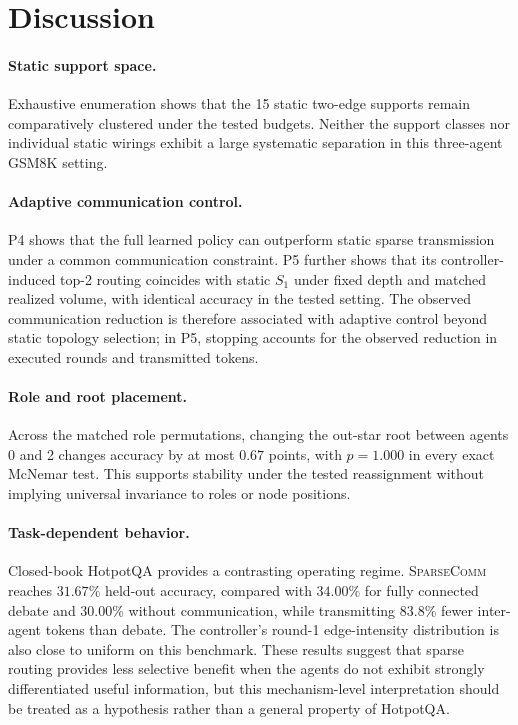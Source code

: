\documentclass[11pt]{article}
\newcommand{\sys}{\textsc{SparseComm}\xspace}
\begin{document}
\section{Discussion}
\label{sec:discussion}

\paragraph{Static support space.}
Exhaustive enumeration shows that the 15 static two-edge supports remain
comparatively clustered under the tested budgets. Neither the support classes
nor individual static wirings exhibit a large systematic separation in this
three-agent GSM8K setting.

\paragraph{Adaptive communication control.}
P4 shows that the full learned policy can outperform static sparse transmission
under a common communication constraint. P5 further shows that its
controller-induced top-2 routing coincides with static $S_1$ under fixed depth
and matched realized volume, with identical accuracy in the tested setting.
The observed communication reduction is therefore associated with adaptive
control beyond static topology selection; in P5, stopping accounts for the
observed reduction in executed rounds and transmitted tokens.

\paragraph{Role and root placement.}
Across the matched role permutations, changing the out-star root between agents
0 and 2 changes accuracy by at most $0.67$ points, with $p=1.000$ in every exact
McNemar test. This supports stability under the tested reassignment without
implying universal invariance to roles or node positions.

\paragraph{Task-dependent behavior.}
Closed-book HotpotQA provides a contrasting operating regime. \sys reaches
$31.67\%$ held-out accuracy,
compared with $34.00\%$ for fully connected debate and $30.00\%$ without
communication, while transmitting $83.8\%$ fewer inter-agent tokens than
debate. The controller's round-1 edge-intensity distribution is also close
to uniform on this benchmark. These results suggest that sparse routing
provides less selective benefit when the agents do not exhibit strongly
differentiated useful information, but this mechanism-level interpretation
should be treated as a hypothesis rather than a general property of
HotpotQA.
\end{document}
